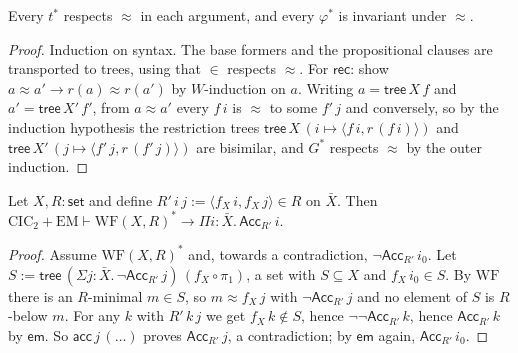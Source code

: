 \documentclass[10pt]{article}
\newcommand{\CIC}{\mathrm{CIC}}
\newcommand{\EM}{\mathrm{EM}}
\newcommand{\WF}{\mathrm{WF}}
\newcommand{\rec}{\mathsf{rec}}
\begin{document}
\begin{lemma}[compatibility]\label{lem:leibniz}
Every $t^*$ respects $\approx$ in each argument, and every $\varphi^*$
is invariant under $\approx$.
\end{lemma}
\begin{proof}
Induction on syntax. The base formers and the propositional clauses are
\cite[Prop.~2]{miquel06} transported to trees, using that $\in$ respects
$\approx$. For $\rec$: show $a\approx a'\to r(a)\approx r(a')$ by
$W$-induction on $a$. Writing $a=\mathsf{tree}\,X\,f$ and
$a'=\mathsf{tree}\,X'\,f'$, from $a\approx a'$ every $f\,i$ is $\approx$ to
some $f'\,j$ and conversely, so by the induction hypothesis the
restriction trees $\mathsf{tree}\,X\,(i\mapsto\langle f\,i,r\,(f\,i)\rangle)$
and $\mathsf{tree}\,X'\,(j\mapsto\langle f'\,j,r\,(f'\,j)\rangle)$ are
bisimilar, and $G^*$ respects $\approx$ by the outer induction.
\end{proof}

\begin{lemma}\label{lem:wf}
Let $X,R:\mathsf{set}$ and define $R'\,i\,j:=\langle f_X\,i,f_X\,j\rangle\in R$
on $\bar X$. Then $\CIC_2+\EM\vdash\WF(X,R)^*\to\Pi i{:}\bar X.\,\mathsf{Acc}_{R'}\,i$.
\end{lemma}
\begin{proof}
Assume $\WF(X,R)^*$ and, towards a contradiction, $\neg\mathsf{Acc}_{R'}\,i_0$.
Let $S:=\mathsf{tree}\,(\Sigma j{:}\bar X.\,\neg\mathsf{Acc}_{R'}\,j)\,(f_X\circ\pi_1)$,
a set with $S\subseteq X$ and $f_X\,i_0\in S$. By $\WF$ there is an
$R$-minimal $m\in S$, so $m\approx f_X\,j$ with $\neg\mathsf{Acc}_{R'}\,j$
and no element of $S$ is $R$-below $m$. For any $k$ with $R'\,k\,j$ we get
$f_X\,k\notin S$, hence $\neg\neg\mathsf{Acc}_{R'}\,k$, hence
$\mathsf{Acc}_{R'}\,k$ by $\mathsf{em}$. So $\mathsf{acc}\,j\,(\ldots)$
proves $\mathsf{Acc}_{R'}\,j$, a contradiction; by $\mathsf{em}$ again,
$\mathsf{Acc}_{R'}\,i_0$.
\end{proof}
\end{document}
